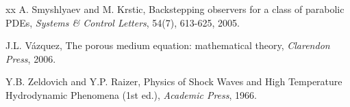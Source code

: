 \documentclass[twocolumn]{autart}
\begin{document}
\begin{thebibliography}{xx}
A. Smyshlyaev and M. Krstic,
\newblock Backstepping observers for a class of parabolic PDEs,
\newblock \emph{Systems \& Control Letters}, 54(7), 613-625, 2005.

J.L. Vázquez,
\newblock The porous medium equation: mathematical theory,
\newblock \emph{Clarendon Press}, 2006.


Y.B. Zeldovich and Y.P. Raizer,
\newblock Physics of Shock Waves and High Temperature Hydrodynamic Phenomena (1st ed.),
\newblock \emph{Academic Press}, 1966.

\end{thebibliography}
\end{document}
